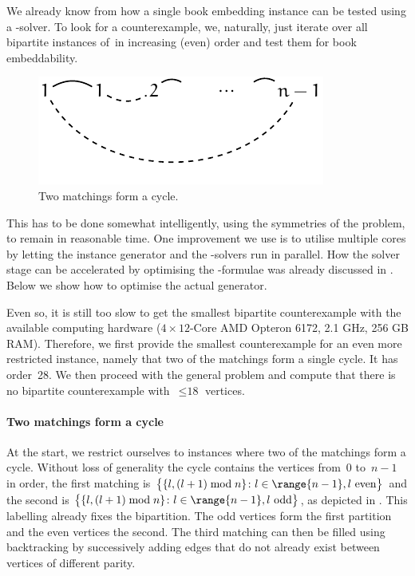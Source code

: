 We already know from  how a single book embedding instance can be tested using a \SAT-solver. To look for a counterexample, we, naturally, just iterate over all bipartite instances of~\probMatching in increasing (even) order and test them for book embeddability.

\begin{figure}[\placement]
    \centering
    \includegraphics{figures/t_bip_cycle}
    \caption[One cycle consisting of two matchings]{Two matchings form a cycle.}
    \label{figure:bip_cycle}
\end{figure}
    
This has to be done somewhat intelligently, using the symmetries of the problem, to remain
in reasonable time. One improvement we use is to utilise multiple cores
by letting the instance generator and the \SAT-solvers run in parallel. How the
solver stage can be accelerated by optimising the \SAT-formulae was already discussed in . Below we show
how to optimise the actual generator. 

Even so, it is still too slow to get the
smallest bipartite counterexample with the available computing hardware ($4\times12$-Core AMD Opteron 6172, 2.1 GHz, 256 GB RAM). Therefore, we first
provide the smallest counterexample for an even more restricted instance, namely that two of the matchings
form a single cycle. It has order~28. We then proceed with the general \probThreeMatching problem
and compute that there is no bipartite counterexample with~$\leq \text{18}$ vertices.

\paragraph{Two matchings form a cycle}

At the start, we restrict ourselves to instances where two of the matchings 
form a cycle. Without loss of generality the cycle contains the vertices from~$0$ to~$n - 1$ in order, the first matching is $\bigl\{\{l, (l + 1)\mymod{n}\}\colon l \in \range{n-1}, \text{$l$ even}\bigr\}$ and
the second is $\bigl\{\{l, (l + 1)\mymod{n}\}\colon l \in \range{n-1}, \text{$l$ odd}\bigr\}$, as depicted in . This labelling already fixes the bipartition. The odd vertices
form the first partition and the even vertices the second. The third matching can then be filled
using backtracking by successively adding edges that do not already exist between vertices of different parity.

